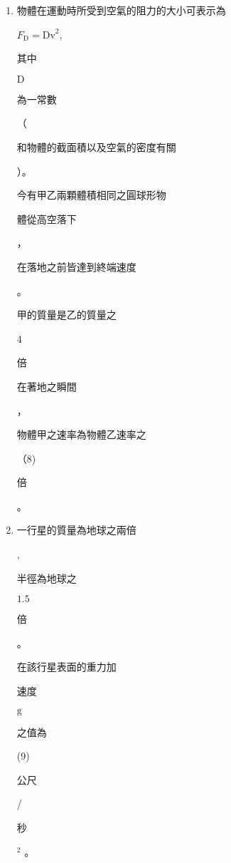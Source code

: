 \documentclass[10pt]{article}
\begin{document}
\begin{enumerate}
  \item \begin{CJK}{UTF8}{mj}物體在運動時所受到空氣的阻力的大小可表示為\end{CJK} $F_{\mathrm{D}}=\mathrm{Dv}^{2}$, \begin{CJK}{UTF8}{mj}其中\end{CJK} $\mathrm{D}$ \begin{CJK}{UTF8}{mj}為一常數\end{CJK} （\begin{CJK}{UTF8}{mj}和物體的截面積以及空氣的密度有關\end{CJK}）。\begin{CJK}{UTF8}{mj}今有甲乙兩顆體積相同之圓球形物\end{CJK} \begin{CJK}{UTF8}{mj}體從高空落下\end{CJK}，\begin{CJK}{UTF8}{mj}在落地之前皆達到終端速度\end{CJK} 。\begin{CJK}{UTF8}{mj}甲的質量是乙的質量之\end{CJK} 4 \begin{CJK}{UTF8}{mj}倍\end{CJK} \begin{CJK}{UTF8}{mj}在著地之瞬間\end{CJK}，\begin{CJK}{UTF8}{mj}物體甲之速率為物體乙速率之\end{CJK}（8) \begin{CJK}{UTF8}{mj}倍\end{CJK}。

  \item \begin{CJK}{UTF8}{mj}一行星的質量為地球之兩倍\end{CJK}, \begin{CJK}{UTF8}{mj}半徑為地球之\end{CJK} $1.5$ \begin{CJK}{UTF8}{mj}倍\end{CJK}。\begin{CJK}{UTF8}{mj}在該行星表面的重力加\end{CJK} \begin{CJK}{UTF8}{mj}速度\end{CJK} $\mathrm{g}$ \begin{CJK}{UTF8}{mj}之值為\end{CJK} (9) \begin{CJK}{UTF8}{mj}公尺\end{CJK}/\begin{CJK}{UTF8}{mj}秒\end{CJK} $^{2}$ 。


\end{enumerate}
\end{document}
